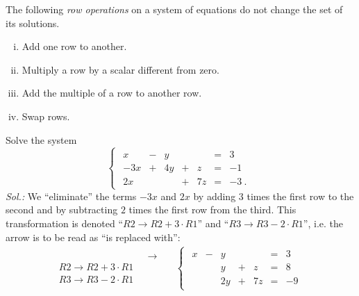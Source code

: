 \begin{definition}
	\label{def:ero}
The following \emph{row operations} on a system of equations do not change the set of its solutions.
\begin{enumerate}[(i)]
\item Add one row to another.
\item Multiply a row by a scalar different from zero.
\item Add the multiple of a row to another row.
\item Swap rows.
\end{enumerate}
\end{definition}

\begin{example}
\label{expl:lin_sys_equ}
Solve the system
\begin{equation*}
\begin{cases}
\begin{array}{rrrrrrr}
 x & - & y &  &  & = & 3 \phantom{\:.} \\
-3 x & + & 4 y & + & z & = & -1 \phantom{\:.} \\
2 x &  & & + & 7 z & = & -3 \:.
\end{array} \end{cases}
\end{equation*}
{\it Sol.:} We ``eliminate'' the terms $-3x$ and $2x$ by adding $3$ times the first row to the second and by subtracting $2$ times the first row from the third. This transformation is denoted ``$R2 \rightarrow R2 + 3 \cdot R1$'' and ``$R3 \rightarrow R3 - 2 \cdot R1$'', i.e. the arrow is to be read as ``is replaced with'':
\begin{equation}
\label{eq:first_3x3_example}
\begin{split}
\begin{array}{cc}
& ~~~\rightarrow~~~ \\
R2 \rightarrow R2 + 3 \cdot R1 & \\
R3 \rightarrow R3 - 2 \cdot R1 &
\end{array}
& \begin{cases}
\begin{array}{rrrrrrr}
x & - & y &  &  & = & 3 \\
 & & y & + & z & = & 8 \\
 & & 2 y & + & 7 z & = & -9 
\end{array} \end{cases} \\ 
\begin{array}{cc}

\end{array}
\end{split}
\end{equation}
\end{example}
